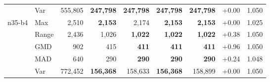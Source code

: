 \begin{small}
\begin{longtable}{llrrrrrrr}
 & Var & 555,805 & \textbf{247,798} & \textbf{247,798} & \textbf{247,798} & \textbf{247,798} & +0.00 & 1.050 \\
n35-b4 & Max & 2,510 & \textbf{2,153} & 2,174 & \textbf{2,153} & \textbf{2,153} & +0.00 & 1.025 \\
 & Range & 2,436 & 1,026 & \textbf{1,022} & \textbf{1,022} & \textbf{1,022} & +0.38 & 1.050 \\
 & GMD & 902 & 415 & \textbf{411} & \textbf{411} & \textbf{411} & +0.96 & 1.050 \\
 & MAD & 640 & 290 & \textbf{290} & \textbf{290} & \textbf{290} & +0.24 & 1.048 \\
 & Var & 772,452 & \textbf{156,368} & 158,633 & \textbf{156,368} & 158,899 & +0.00 & 1.050 \\
\end{longtable}
\end{small}
